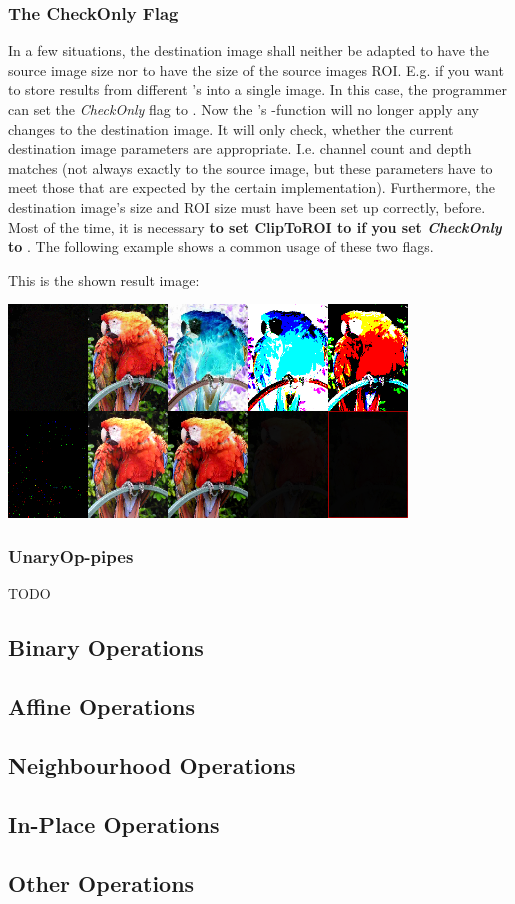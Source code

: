 \subsubsection{The CheckOnly Flag\label{subsec:check-only}}
In a few situations, the destination image shall neither be adapted to have the source image size nor to have the size of the source images ROI. E.g. if you want to store results from different 's into a single image. In this case, the programmer can set the  \emph{CheckOnly} flag to . Now the 's -function will no longer apply any changes to the destination image. It will only check, whether the current destination image parameters are appropriate. I.e. channel count and depth matches (not always exactly to the source image, but these parameters have to meet those that are expected by the certain  implementation). Furthermore, the destination image's size and ROI size must have been set up correctly, before. Most of the time, it is necessary \textbf{to set ClipToROI to  if you set \emph{CheckOnly} to }. The following example shows a common usage of these two flags.


This is the shown result image:

\includegraphics[width=300pt]{media/check-only-example-output}

\subsubsection{UnaryOp-pipes}
TODO

\subsection{Binary Operations\label{subsec:binary-ops}}

\subsection{Affine Operations\label{subsec:affine-ops}}

\subsection{Neighbourhood Operations\label{subsec:nbh-ops}}

\subsection{In-Place Operations\label{subsec:inplace-ops}}

\subsection{Other Operations\label{subsec:other-ops}} 
